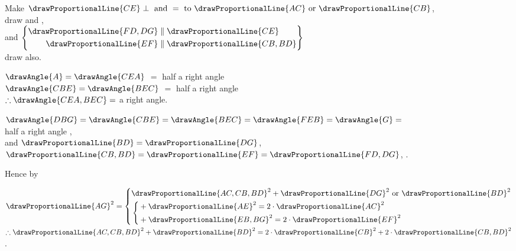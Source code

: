 \documentclass[booklanguage=english]{byrnebook}
\begin{document}
\begin{center}
Make $\drawProportionalLine{CE} \perp \mbox{ and } = \mbox{ to } \drawProportionalLine{AC} \mbox{ or } \drawProportionalLine{CB}$,\\
draw  and ,\\
and $\left\{
\begin{aligned}
\drawProportionalLine{FD,DG} & \parallel \drawProportionalLine{CE} \\
\drawProportionalLine{EF} & \parallel \drawProportionalLine{CB,BD}\\
\end{aligned}
\right\}$ \\
draw  also.

$\drawAngle{A} = \drawAngle{CEA}$  $=$ half a right angle \\
$\drawAngle{CBE} = \drawAngle{BEC}$  $=$ half a right angle \\
$\therefore \drawAngle{CEA,BEC} = $ a right angle.

$\drawAngle{DBG} = \drawAngle{CBE} = \drawAngle{BEC} = \drawAngle{FEB} = \drawAngle{G} =$\\
half a right angle ,\\ %
and $\drawProportionalLine{BD} = \drawProportionalLine{DG}$, $\drawProportionalLine{CB,BD} = \drawProportionalLine{EF} = \drawProportionalLine{FD,DG}$, .

Hence by 

$\drawProportionalLine{AG}^2 = \left\{
\begin{aligned}
& \drawProportionalLine{AC,CB,BD}^2 + \drawProportionalLine{DG}^2 \mbox{ or } \drawProportionalLine{BD}^2 \\
& \left\{
	\begin{aligned}
		& + \drawProportionalLine{AE}^2 = 2 \cdot \drawProportionalLine{AC}^2 \\
		& + \drawProportionalLine{EB,BG}^2 = 2\cdot \drawProportionalLine{EF}^2 \\
	\end{aligned}
	\right. \\
\end{aligned}
\right.$\\
$\therefore \drawProportionalLine{AC,CB,BD}^2 + \drawProportionalLine{BD}^2 = 2 \cdot \drawProportionalLine{CB}^2 + 2 \cdot \drawProportionalLine{CB,BD}^2$.
\end{center}
\end{document}
